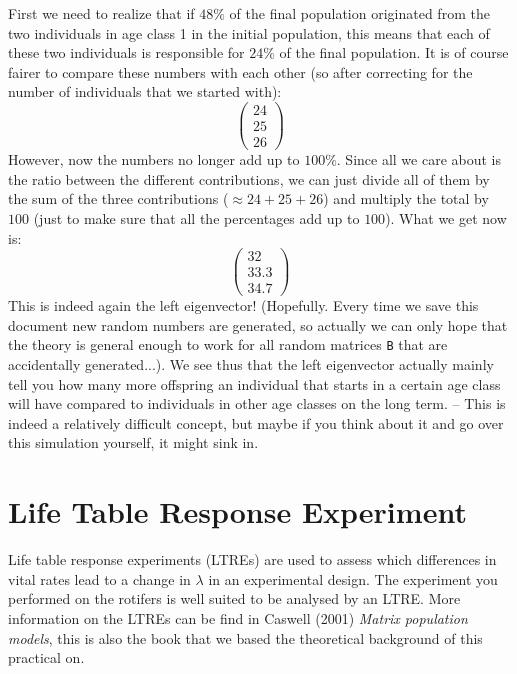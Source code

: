 \documentclass{article}\usepackage[]{graphicx}\usepackage[]{color}
\begin{document}
\begin{mdframed}
First we need to realize that if $48\% $ of the final population originated from the two individuals in age class 1 in the initial population, this means that each of these two individuals is responsible for $24\% $ of the final population. It is of course fairer to compare these numbers with each other (so after correcting for the number of individuals that we started with):
\begin{equation*}
\begin{pmatrix}
24 \\
25 \\
26
\end{pmatrix}
\end{equation*}
However, now the numbers no longer add up to $100\%$. Since all we care about is the ratio between the different contributions, we can just divide all of them by the sum of the three contributions ($\approx 24 +25 + 26 $) and multiply the total by $100$ (just to make sure that all the percentages add up to $100$). What we get now is: 
\begin{equation*}
\begin{pmatrix}
32 \\
33.3 \\
34.7
\end{pmatrix}
\end{equation*}
This is indeed again the left eigenvector! (Hopefully. Every time we save this document new random numbers are generated, so actually we can only hope that the theory is general enough to work for all random matrices \texttt{B} that are accidentally generated...). We see thus that the left eigenvector actually mainly tell you how many more offspring an individual that starts in a certain age class will have compared to individuals in other age classes on the long term. -- This is indeed a relatively difficult concept, but maybe if you think about it and go over this simulation yourself, it might sink in.
\end{mdframed}
\section{Life Table Response Experiment}
Life table response experiments (LTREs) are used to assess which  differences in vital rates lead to a change in $\lambda$ in an experimental design. The experiment you performed on the rotifers is well suited to be analysed by an LTRE. More information on the LTREs can be find in Caswell (2001) \textit{Matrix population models}, this is also the book that we based the theoretical background of this practical on. 
\end{document}
